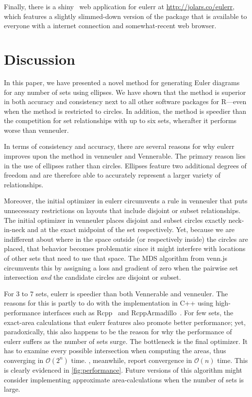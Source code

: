 \documentclass[
  oneside,
  openany,
  numbers=noendperiod,
  parskip=half,
  bibliography=totoc
]{scrbook}\usepackage[]{graphicx}\usepackage{xcolor}
\newcommand{\pkg}[1]{{\fontseries{b}\selectfont #1}}
\begin{document}
Finally, there is a \pkg{shiny}~\citep{Chang_2017} web application for
\pkg{eulerr} at \url{http://jolars.co/eulerr}, which features
a slightly slimmed-down version of the package that is available to everyone
with a internet connection and somewhat-recent web browser.

\chapter{Discussion}
\label{ch:discussion}

In this paper, we have presented a novel method for generating Euler diagrams
for any number of sets using ellipses. We have shown that the method is superior
in both accuracy and consistency next to all other software packages for
R---even when the method is restricted to circles. In addition, the method is
speedier than the competition for set relationships with up to six sets,
wherafter it performs worse than \pkg{venneuler}.

In terms of consistency and accuracy, there are several reasons for why
\pkg{eulerr} improves upon the method in \pkg{venneuler} and \pkg{Vennerable}.
The primary reason lies in the use of ellipses rather than circles. Ellipses
feature two additional degrees of freedom and are therefore able to accurately
represent a larger variety of relationships.

Moreover, the initial optimizer in \pkg{eulerr} circumvents a rule in
\pkg{venneuler} that puts unnecessary restrictions on layouts that include
disjoint or subset relationships. The initial optimizer in venneuler places
disjoint and subset circles exactly neck-in-neck and at the exact midpoint of
the set respectively. Yet, because we are indifferent about where in the space
outside (or respectively inside) the circles are placed, that behavior becomes
problematic since it might interfere with locations of other sets that need to
use that space. The MDS algorithm from \pkg{venn.js} circumvents this by
assigning a loss and gradient of zero when the pairwise set intersection
\emph{and} the candidate circles are disjoint or subset.

For 3 to 7 sets, \pkg{eulerr} is speedier than both \pkg{Vennerable} and
\pkg{venneuler}. The reasons for this is partly to do with the implementation
in C++ using high-performance interfaces such as
\pkg{Rcpp}~\citep{eddelbuettel_2011} and
\pkg{RcppArmadillo}~\citep{eddelbuettel_2014}. For few sets, the exact-area
calculations that \pkg{eulerr} features also promote better performance; yet,
paradoxically, this also happens to be the reason for why the performance of
\pkg{eulerr} suffers as the number of sets surge. The bottleneck is the final
optimizer. It has to examine every possible intersection when computing the
areas, thus converging in $\mathcal{O}(2^n)$ time. \citet{wilkinson_2012},
meanwhile, report convergence in $\mathcal{O}(n)$ time. This is clearly
evidenced in \cref{fig:performance}. Future versions of this algorithm might
consider implementing approximate area-calculations when the number of sets is
large.
\end{document}

